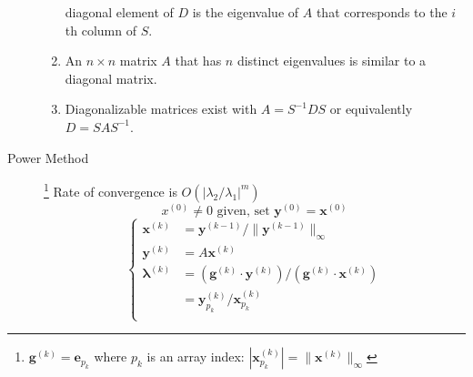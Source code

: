 \documentclass[8pt]{article}
\begin{document}
\begin{multicols}{2}
\begin{description}
\begin{enumerate}[i]
      diagonal element of $D$ is the eigenvalue of $A$ that
      corresponds to the $i$th column of $S$.
    \item An $n\times n$ matrix $A$ that has $n$ distinct eigenvalues is
      similar to a diagonal matrix.
    \item Diagonalizable matrices exist with $A=S^{-1}DS$ or equivalently $D=SAS^{-1}$.
    \end{enumerate}
  \item[Power Method]
    \footnote{\label{ft:powmtd_g}$\mathbf{g}^{(k)} = \mathbf{e}_{p_k}$ where $p_k$ is an array
      index: $|\mathbf{x}^{(k)}_{p_k}| = \|\mathbf{x}^{(k)}\|_\infty$}
     Rate of convergence is  $O(|\lambda_2/\lambda_1|^{m})$
    $$x^{(0)} \neq 0\text{ given, set } \mathbf{y}^{(0)}=\mathbf{x}^{(0)}$$
    \begin{equation*}
      \left\{
    \begin{aligned}
        \mathbf{x}^{(k)} &= \mathbf{y}^{(k-1)}/\|\mathbf{y}^{(k-1)}\|_\infty \\
        \mathbf{y}^{(k)} &= A\mathbf{x}^{(k)} \\
        \boldsymbol{\lambda}^{(k)} &= (\mathbf{g}^{(k)} \cdot \mathbf{y}^{(k)})/(\mathbf{g}^{(k)} \cdot \mathbf{x}^{(k)}) \\
        &=\mathbf{y}^{(k)}_{p_k}/\mathbf{x}^{(k)}_{p_k} \\
      \end{aligned}
      \right.
    \end{equation*}


\end{description}
\end{multicols}
\end{document}
